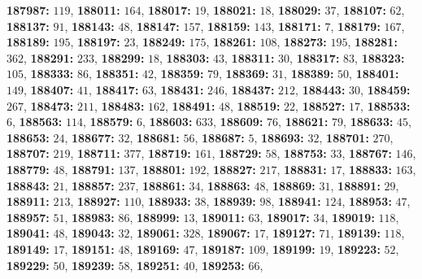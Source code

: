 \textsf{\bfseries 187987:} $119$, \textsf{\bfseries 188011:} $164$, \textsf{\bfseries 188017:} $19$, \textsf{\bfseries 188021:} $18$, \textsf{\bfseries 188029:} $37$, \textsf{\bfseries 188107:} $62$, \textsf{\bfseries 188137:} $91$, \textsf{\bfseries 188143:} $48$, \textsf{\bfseries 188147:} $157$, \textsf{\bfseries 188159:} $143$, \textsf{\bfseries 188171:} $7$, \textsf{\bfseries 188179:} $167$, \textsf{\bfseries 188189:} $195$, \textsf{\bfseries 188197:} $23$, \textsf{\bfseries 188249:} $175$, \textsf{\bfseries 188261:} $108$, \textsf{\bfseries 188273:} $195$, \textsf{\bfseries 188281:} $362$, \textsf{\bfseries 188291:} $233$, \textsf{\bfseries 188299:} $18$, \textsf{\bfseries 188303:} $43$, \textsf{\bfseries 188311:} $30$, \textsf{\bfseries 188317:} $83$, \textsf{\bfseries 188323:} $105$, \textsf{\bfseries 188333:} $86$, \textsf{\bfseries 188351:} $42$, \textsf{\bfseries 188359:} $79$, \textsf{\bfseries 188369:} $31$, \textsf{\bfseries 188389:} $50$, \textsf{\bfseries 188401:} $149$, \textsf{\bfseries 188407:} $41$, \textsf{\bfseries 188417:} $63$, \textsf{\bfseries 188431:} $246$, \textsf{\bfseries 188437:} $212$, \textsf{\bfseries 188443:} $30$, \textsf{\bfseries 188459:} $267$, \textsf{\bfseries 188473:} $211$, \textsf{\bfseries 188483:} $162$, \textsf{\bfseries 188491:} $48$, \textsf{\bfseries 188519:} $22$, \textsf{\bfseries 188527:} $17$, \textsf{\bfseries 188533:} $6$, \textsf{\bfseries 188563:} $114$, \textsf{\bfseries 188579:} $6$, \textsf{\bfseries 188603:} $633$, \textsf{\bfseries 188609:} $76$, \textsf{\bfseries 188621:} $79$, \textsf{\bfseries 188633:} $45$, \textsf{\bfseries 188653:} $24$, \textsf{\bfseries 188677:} $32$, \textsf{\bfseries 188681:} $56$, \textsf{\bfseries 188687:} $5$, \textsf{\bfseries 188693:} $32$, \textsf{\bfseries 188701:} $270$, \textsf{\bfseries 188707:} $219$, \textsf{\bfseries 188711:} $377$, \textsf{\bfseries 188719:} $161$, \textsf{\bfseries 188729:} $58$, \textsf{\bfseries 188753:} $33$, \textsf{\bfseries 188767:} $146$, \textsf{\bfseries 188779:} $48$, \textsf{\bfseries 188791:} $137$, \textsf{\bfseries 188801:} $192$, \textsf{\bfseries 188827:} $217$, \textsf{\bfseries 188831:} $17$, \textsf{\bfseries 188833:} $163$, \textsf{\bfseries 188843:} $21$, \textsf{\bfseries 188857:} $237$, \textsf{\bfseries 188861:} $34$, \textsf{\bfseries 188863:} $48$, \textsf{\bfseries 188869:} $31$, \textsf{\bfseries 188891:} $29$, \textsf{\bfseries 188911:} $213$, \textsf{\bfseries 188927:} $110$, \textsf{\bfseries 188933:} $38$, \textsf{\bfseries 188939:} $98$, \textsf{\bfseries 188941:} $124$, \textsf{\bfseries 188953:} $47$, \textsf{\bfseries 188957:} $51$, \textsf{\bfseries 188983:} $86$, \textsf{\bfseries 188999:} $13$, \textsf{\bfseries 189011:} $63$, \textsf{\bfseries 189017:} $34$, \textsf{\bfseries 189019:} $118$, \textsf{\bfseries 189041:} $48$, \textsf{\bfseries 189043:} $32$, \textsf{\bfseries 189061:} $328$, \textsf{\bfseries 189067:} $17$, \textsf{\bfseries 189127:} $71$, \textsf{\bfseries 189139:} $118$, \textsf{\bfseries 189149:} $17$, \textsf{\bfseries 189151:} $48$, \textsf{\bfseries 189169:} $47$, \textsf{\bfseries 189187:} $109$, \textsf{\bfseries 189199:} $19$, \textsf{\bfseries 189223:} $52$, \textsf{\bfseries 189229:} $50$, \textsf{\bfseries 189239:} $58$, \textsf{\bfseries 189251:} $40$, \textsf{\bfseries 189253:} $66$, 
